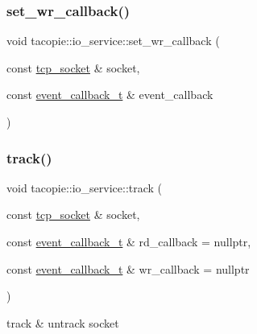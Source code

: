\mbox{\label{classtacopie_1_1io__service_a7c4f56c7790c7ba52b09837a42aaffb1}} 
\subsubsection{\texorpdfstring{set\+\_\+wr\+\_\+callback()}{set\_wr\_callback()}}
{\footnotesize\ttfamily void tacopie\+::io\+\_\+service\+::set\+\_\+wr\+\_\+callback (\begin{DoxyParamCaption}\item[{const \hyperlink{classtacopie_1_1tcp__socket}{tcp\+\_\+socket} \&}]{socket,  }\item[{const \hyperlink{classtacopie_1_1io__service_abb66850c32d9c724f4418d77bd04bcfd}{event\+\_\+callback\+\_\+t} \&}]{event\+\_\+callback }\end{DoxyParamCaption})}

\mbox{\label{classtacopie_1_1io__service_a9f4c8bce3c0f6d660515b0b5eb109df8}} 
\subsubsection{\texorpdfstring{track()}{track()}}
{\footnotesize\ttfamily void tacopie\+::io\+\_\+service\+::track (\begin{DoxyParamCaption}\item[{const \hyperlink{classtacopie_1_1tcp__socket}{tcp\+\_\+socket} \&}]{socket,  }\item[{const \hyperlink{classtacopie_1_1io__service_abb66850c32d9c724f4418d77bd04bcfd}{event\+\_\+callback\+\_\+t} \&}]{rd\+\_\+callback = {\ttfamily nullptr},  }\item[{const \hyperlink{classtacopie_1_1io__service_abb66850c32d9c724f4418d77bd04bcfd}{event\+\_\+callback\+\_\+t} \&}]{wr\+\_\+callback = {\ttfamily nullptr} }\end{DoxyParamCaption})}



track \& untrack socket 

\mbox{\label{classtacopie_1_1io__service_a9a7672f0894a0fc1a3e6c593ca6df22c}} 
